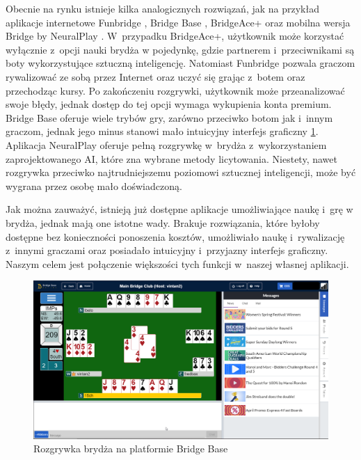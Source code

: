 Obecnie na rynku istnieje kilka analogicznych rozwiązań, jak na przykład
aplikacje internetowe Funbridge \cite{funbridge}, Bridge Base \cite{bridgebase},
BridgeAce+ \cite{bridgeace} oraz mobilna wersja Bridge by NeuralPlay
\cite{neuralplay}. W~przypadku BridgeAce+, użytkownik może korzystać wyłącznie
z~opcji nauki brydża w pojedynkę, gdzie partnerem i~przeciwnikami są boty
wykorzystujące sztuczną inteligencję. Natomiast Funbridge pozwala graczom
rywalizować ze sobą przez Internet oraz uczyć się grając z~botem oraz
przechodząc kursy. Po zakończeniu rozgrywki, użytkownik może przeanalizować
swoje błędy, jednak dostęp do tej opcji wymaga wykupienia konta premium.
Bridge Base oferuje wiele trybów gry, zarówno przeciwko botom jak i~innym
graczom, jednak jego minus stanowi mało intuicyjny interfejs graficzny
\ref{fig:bridge-base}. Aplikacja NeuralPlay oferuje pełną rozgrywkę w~brydża
z~wykorzystaniem zaprojektowanego AI, które zna wybrane metody licytowania.
Niestety, nawet rozgrywka przeciwko najtrudniejszemu poziomowi sztucznej
inteligencji, może być wygrana przez osobę mało doświadczoną.
\newline

Jak można zauważyć, istnieją już dostępne aplikacje umożliwiające naukę
i~grę w brydża, jednak mają one istotne wady. Brakuje rozwiązania, które
byłoby dostępne bez konieczności ponoszenia kosztów, umożliwiało naukę
i~rywalizację z~innymi graczami oraz posiadało intuicyjny i~przyjazny
interfejs graficzny. Naszym celem jest połączenie większości tych funkcji
w~naszej własnej aplikacji.

\begin{figure}[h]
  \centering
  \includegraphics[width=\textwidth]{img/brydz-platformy/bridgebase.png}
  \caption{Rozgrywka brydża na platformie Bridge Base}
  \label{fig:bridge-base}
\end{figure}

